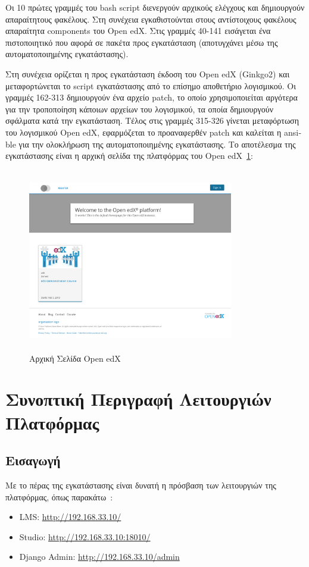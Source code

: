 \documentclass[12pt]{report}
\begin{document}
Οι 10 πρώτες γραμμές του \textlatin{bash script} διενεργούν αρχικούς ελέγχους και δημιουργούν απαραίτητους φακέλους. Στη συνέχεια εγκαθιστούνται στους αντίστοιχους φακέλους απαραίτητα \textlatin{components} του \textlatin{Open edX}. Στις γραμμές 40-141 εισάγεται ένα πιστοποιητικό που αφορά σε πακέτα προς εγκατάσταση (αποτυγχάνει μέσω της αυτοματοποιημένης εγκατάστασης).

Στη συνέχεια ορίζεται η προς εγκατάσταση έκδοση του \textlatin{Open edX (Ginkgo2)} και μεταφορτώνεται το \textlatin{script} εγκατάστασης από το επίσημο αποθετήριο λογισμικού. Οι γραμμές 162-313 δημιουργούν ένα αρχείο \textlatin{patch}, το οποίο χρησιμοποιείται αργότερα για την τροποποίηση κάποιων αρχείων του λογισμικού, τα οποία δημιουργούν σφάλματα κατά την εγκατάσταση. Τέλος στις γραμμές 315-326 γίνεται μεταφόρτωση του λογισμικού \textlatin{Open edX}, εφαρμόζεται το προαναφερθέν \textlatin{patch} και καλείται η \textlatin{ansible} για την ολοκλήρωση της αυτοματοποιημένης εγκατάστασης. Το αποτέλεσμα της εγκατάστασης είναι η αρχική σελίδα της πλατφόρμας του \textlatin{Open edX}~\ref{fig:edx_landing}:
\begin{figure}[!htbp]
\centering
\includegraphics[width=0.8\textwidth, height=8cm]{openedx-start}
\caption{Αρχική Σελίδα \textlatin{Open edX}}
\label{fig:edx_landing}
\end{figure}

\section{Συνοπτική Περιγραφή Λειτουργιών Πλατφόρμας}
\subsection{Εισαγωγή}\label{edx_intro}
Με το πέρας της εγκατάστασης είναι δυνατή η πρόσβαση των λειτουργιών της πλατφόρμας, όπως παρακάτω~\cite{confluence_1}:
\begin{itemize}
  \item \textlatin{LMS: \url{http://192.168.33.10/}}
  \item \textlatin{Studio: \url{http://192.168.33.10:18010/}}
  \item \textlatin{Django Admin: \url{http://192.168.33.10/admin}}
\end{itemize}
\end{document}
